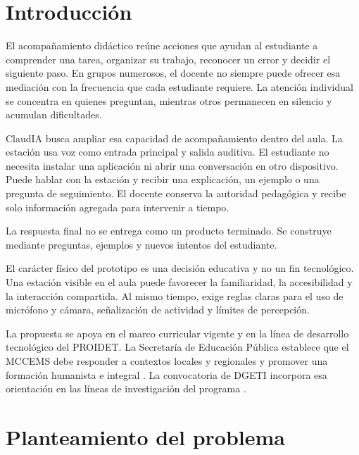 \documentclass[letterpaper,11pt]{article}
\begin{document}
\fontsize{11}{19}\selectfont

\section{Introducción}

El acompañamiento didáctico reúne acciones que ayudan al estudiante a comprender una tarea, organizar su trabajo, reconocer un error y decidir el siguiente paso. En grupos numerosos, el docente no siempre puede ofrecer esa mediación con la frecuencia que cada estudiante requiere. La atención individual se concentra en quienes preguntan, mientras otros permanecen en silencio y acumulan dificultades.

ClaudIA busca ampliar esa capacidad de acompañamiento dentro del aula. La estación usa voz como entrada principal y salida auditiva. El estudiante no necesita instalar una aplicación ni abrir una conversación en otro dispositivo. Puede hablar con la estación y recibir una explicación, un ejemplo o una pregunta de seguimiento. El docente conserva la autoridad pedagógica y recibe solo información agregada para intervenir a tiempo.

La respuesta final no se entrega como un producto terminado. Se construye mediante preguntas, ejemplos y nuevos intentos del estudiante.

El carácter físico del prototipo es una decisión educativa y no un fin tecnológico. Una estación visible en el aula puede favorecer la familiaridad, la accesibilidad y la interacción compartida. Al mismo tiempo, exige reglas claras para el uso de micrófono y cámara, señalización de actividad y límites de percepción.

La propuesta se apoya en el marco curricular vigente y en la línea de desarrollo tecnológico del PROIDET. La Secretaría de Educación Pública establece que el MCCEMS debe responder a contextos locales y regionales y promover una formación humanista e integral \cite{sep2025mccms}. La convocatoria de DGETI incorpora esa orientación en las líneas de investigación del programa \cite{dgeti2026}.

\clearpage

\section{Planteamiento del problema}
\end{document}
